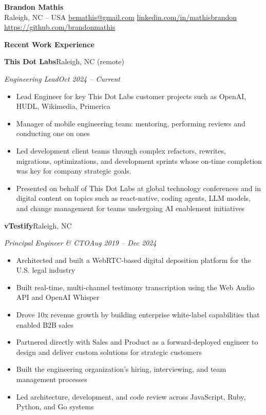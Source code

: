 \documentclass[10pt,letterpaper]{article}
\newcommand{\resumesection}[1]{%
  \par\addvspace{9pt}
  {\centering\large\bfseries #1\par}
  \vspace{5pt}
}
\newcommand{\resumeentry}[4]{%
  \par\addvspace{6pt}
  {\bfseries #1}\hfill #2\par
  \textit{#3}\hfill \textit{#4}\par
}
\newenvironment{resumebullets}{%
  \begin{itemize}[
    leftmargin=1.5em,
    label=\textbullet,
    itemsep=1pt,
    parsep=0pt,
    topsep=3pt,
    partopsep=0pt
  ]
}{%
  \end{itemize}
}
\begin{document}
\begin{center}
  {\LARGE\bfseries Brandon Mathis}\\[4pt]
  {\small
    Raleigh, NC -- USA \enspace\textbullet\enspace
    \href{mailto:bemathis@gmail.com}{bemathis@gmail.com}
    \enspace\textbullet\enspace
    \href{https://linkedin.com/in/mathisbrandon}{linkedin.com/in/mathisbrandon}
    \enspace\textbullet\enspace
    \href{https://github.com/brandonmathis}{https://github.com/brandonmathis}
  }
\end{center}

\resumesection{Recent Work Experience}

\resumeentry{This Dot Labs}{Raleigh, NC (remote)}
  {Engineering Lead}{Oct 2024 -- Current}
\begin{resumebullets}
  \item Lead Engineer for key This Dot Labs customer projects such as OpenAI, HUDL, Wikimedia, Primerica
  \item Manager of mobile engineering team: mentoring, performing reviews and conducting one on ones
  \item Led development client teams through complex refactors, rewrites, migrations, optimizations, and development sprints whose on-time completion was key for company strategic goals.
  \item Presented on behalf of This Dot Labs at global technology conferences and in digital content on topics such as react-native, coding agents, LLM models, and change management for teams undergoing AI enablement initiatives
\end{resumebullets}

\resumeentry{vTestify}{Raleigh, NC}
  {Principal Engineer \& CTO}{Aug 2019 -- Dec 2024}
\begin{resumebullets}
  \item Architected and built a WebRTC-based digital deposition platform for the U.S. legal industry
  \item Built real-time, multi-channel testimony transcription using the Web Audio API and OpenAI Whisper
  \item Drove 10x revenue growth by building enterprise white-label capabilities that enabled B2B sales
  \item Partnered directly with Sales and Product as a forward-deployed engineer to design and deliver custom solutions for strategic customers
  \item Built the engineering organization's hiring, interviewing, and team management processes
  \item Led architecture, development, and code review across JavaScript, Ruby, Python, and Go systems
\end{resumebullets}
\end{document}
